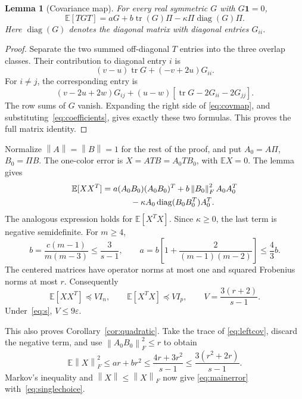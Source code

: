 \documentclass[11pt]{article}
\newtheorem{lemma}[theorem]{Lemma}
\newcommand{\E}{\mathbb E}
\newcommand{\norm}[1]{\left\lVert#1\right\rVert}
\newcommand{\tr}{\operatorname{tr}}
\newcommand{\diag}{\operatorname{diag}}
\begin{document}
\begin{lemma}[Covariance map]\label{lem:cov}
For every real symmetric $G$ with $G\mathbf1=0$,
\begin{equation}\label{eq:covmap}
 \E[TGT]=aG+b\tr(G)\Pi-\kappa\Pi\diag(G)\Pi.
\end{equation}
Here $\diag(G)$ denotes the diagonal matrix with diagonal entries $G_{ii}$.
\end{lemma}
\begin{proof}
Separate the two summed off-diagonal $T$ entries into the three overlap
classes. Their contribution to diagonal entry $i$ is
\[
 (v-u)\tr G+(-v+2u)G_{ii}.
\]
For $i\ne j$, the corresponding entry is
\[
 (v-2u+2w)G_{ij}+(u-w)[\tr G-2G_{ii}-2G_{jj}].
\]
The row sums of $G$ vanish. Expanding the right side of
\eqref{eq:covmap}, and substituting~\eqref{eq:coefficients}, gives exactly
these two formulas. This proves the full matrix identity.
\end{proof}

Normalize $\norm A=\norm B=1$ for the rest of the proof, and put
$A_0=A\Pi$, $B_0=\Pi B$. The one-color error is
$X=ATB=A_0TB_0$, with $\E X=0$. The lemma gives
\begin{align}\label{eq:leftcov}
 \E[XX^T]
 &=a(A_0B_0)(A_0B_0)^T+b\norm{B_0}_F^2 A_0A_0^T\nonumber\\
 &\hspace{12mm}-\kappa A_0\diag(B_0B_0^T)A_0^T.
\end{align}
The analogous expression holds for $\E[X^TX]$. Since $\kappa\ge0$,
the last term is negative semidefinite. For $m\ge4$,
\begin{equation}\label{eq:abounds}
 b=\frac{c(m-1)}{m(m-3)}\le\frac3{s-1},\qquad
 a=b\left[1+\frac2{(m-1)(m-2)}\right]\le\frac43 b.
\end{equation}
The centered matrices have operator norms at most one and squared
Frobenius norms at most $r$. Consequently
\begin{equation}\label{eq:variance}
 \E[XX^T]\preceq VI_n,\qquad \E[X^TX]\preceq VI_p,
 \qquad V=\frac{3(r+2)}{s-1}.
\end{equation}
Under~\eqref{eq:s}, $V\le9\varepsilon$.

This also proves Corollary~\ref{cor:quadratic}. Take the trace of
\eqref{eq:leftcov}, discard the negative term, and use
$\norm{A_0B_0}_F^2\le r$ to obtain
\[
 \E\norm X_F^2\le ar+br^2
 \le\frac{4r+3r^2}{s-1}\le\frac{3(r^2+2r)}{s-1}.
\]
Markov's inequality and $\norm X\le\norm X_F$ now give
\eqref{eq:mainerror} with~\eqref{eq:singlechoice}.
\end{document}
